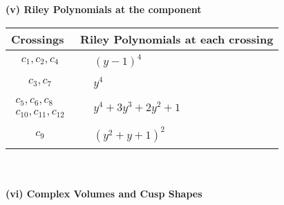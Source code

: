 \documentclass[1p]{elsarticle_modified}
\theoremstyle{definition}
\begin{document}
\newpage\renewcommand{\arraystretch}{1}
\flushleft \textbf{(v) Riley Polynomials at the component}\newline \\
\begin{tabular}{m{50pt}|m{274pt}}
Crossings & \hspace{64pt}Riley Polynomials at each crossing \\
\hline $$\begin{aligned}c_{1},c_{2},c_{4}\end{aligned}$$&$\begin{aligned}
&(y-1)^4
\end{aligned}$\\
\hline $$\begin{aligned}c_{3},c_{7}\end{aligned}$$&$\begin{aligned}
&y^4
\end{aligned}$\\
\hline $$\begin{aligned}c_{5},c_{6},c_{8}\\c_{10},c_{11},c_{12}\end{aligned}$$&$\begin{aligned}
&y^4+3 y^3+2 y^2+1
\end{aligned}$\\
\hline $$\begin{aligned}c_{9}\end{aligned}$$&$\begin{aligned}
&(y^2+y+1)^2
\end{aligned}$\\
\hline
\end{tabular}\\~\\
\newpage\flushleft \textbf{(vi) Complex Volumes and Cusp Shapes}
\end{document}
